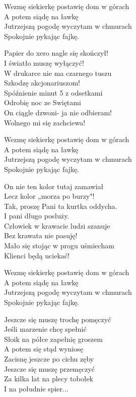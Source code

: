 \begin{text}

    \vin Wezmę siekierkę postawię dom w górach\\
    \vin A potem siądę na ławkę\\
    \vin Jutrzejszą pogodę wyczytam w chmurach\\
    \vin Spokojnie pykając fajkę.

    Papier do xero nagle się skończył! \\
    I światło muszę wyłączyć!\\
    W drukarce nie ma czarnego tuszu\\
    Szkodzę akcjonariuszom!\\
    Spóźnienie minut 5 z odsetkami\\
    Odrobię noc ze Swiętami\\
    On ciągle dzwoni- ja nie odbieram!\\
    Wolnego mi się zachciewa!

    \vin Wezmę siekierkę postawię dom w górach\\
    \vin A potem siądę na ławkę\\
    \vin Jutrzejszą pogodę wyczytam w chmurach\\
    \vin Spokojnie pykając fajkę.

    On nie ten kolor tutaj zamawiał\\
    Lecz kolor „morza po burzy"!\\
    Tak, proszę Pani ta kurtka oddycha.\\
    I pani długo posłuży.\\
    Człowiek w krawacie ludzi szanuje\\
    Bez krawata nie pasuję!\\
    Mało się stojąc w progu uśmiecham\\
    Klienci będą uciekać!

    \vin Wezmę siekierkę postawię dom w górach\\
    \vin A potem siądę na ławkę\\
    \vin Jutrzejszą pogodę wyczytam w chmurach\\
    \vin Spokojnie pykając fajkę.

    Jeszcze się muszę trochę pomęczyć\\
    Jeśli marzenie chcę spełnić\\
    Słoik na półce zapełnię groszem\\
    A potem się stąd wyniosę\\
    Zacisnę jeszcze po cichu zęby\\
    Jeszcze się muszę przemęczyć\\
    Za kilka lat na plecy tobołek\\
    I na południe spier...

\end{text}
